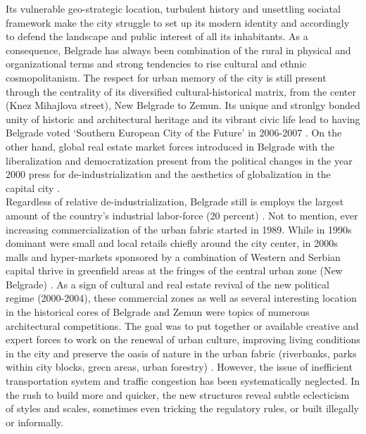 \documentclass[11pt]{report}
\begin{document}
Its vulnerable geo-strategic location, turbulent history and unsettling sociatal framework make the city struggle to set up its modern identity and accordingly to defend the landscape and public interest of all its inhabitants. As a consequence, Belgrade has always been combination of the rural in physical and organizational terms and strong tendencies to rise cultural and ethnic cosmopolitanism. The respect for urban memory of the city is still present through the centrality of its diversified cultural-historical matrix, from the center (Knez Mihajlova street), New Belgrade to Zemun. Its unique and stronlgy bonded unity of historic and architectural heritage and its vibrant civic life lead to having Belgrade voted ‘Southern European City of the Future’ in 2006-2007 \cite{(Hirt 2009)}.
On the other hand, global real estate market forces introduced in Belgrade with the liberalization and democratization present from the political changes in the year 2000 press for de-industrialization and the aesthetics of globalization in the capital city \cite{Grozdanic}.
\\
Regardless of relative de-industrialization, Belgrade  still is employs the largest amount of the country’s industrial labor-force (20 percent) \cite{(Hirt 2009)}. Not to mention, ever increasing commercialization of the urban fabric started in 1989. While in 1990s dominant were small and local retails chiefly around the city center, in 2000s  malls and hyper-markets sponsored by a combination of Western and Serbian capital thrive in greenfield areas at the fringes of the central urban zone (New Belgrade) \cite{(Hirt 2009)}.
As a sign of cultural and real estate revival of the new political regime (2000-2004), these commercial zones as well as several interesting location in the historical cores of Belgrade and Zemun were topics of numerous  architectural  competitions\footnotemark \cite{ref(Stupar 2004 isocarp)}.
The goal was to put together or available creative and expert forces to work on the renewal of urban culture, improving living conditions in the city and preserve the oasis of nature in the urban fabric (riverbanks, parks within city blocks, grecn areas, urban forestry) \cite{Grozdanic}.
However, the issue of inefficient transportation system and traffic congestion has been systematically neglected.
In the rush to build more and quicker, the new structures reveal subtle eclecticism of styles and scales, sometimes even tricking the regulatory rules, or built illegally or informally.
\end{document}
